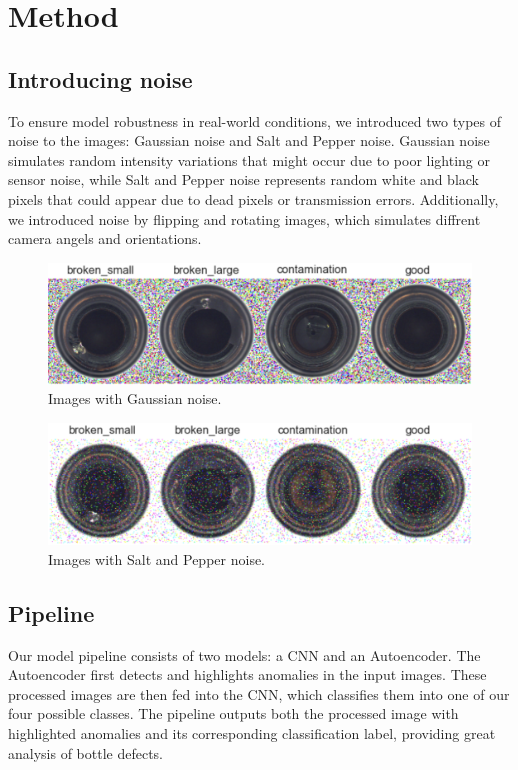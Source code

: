 \section{Method}

\subsection{Introducing noise}
To ensure model robustness in real-world conditions, we introduced two types of noise to the images: Gaussian noise and Salt and Pepper noise. 
Gaussian noise simulates random intensity variations that might occur due to poor lighting or sensor noise, while Salt and Pepper noise represents random white and black pixels that could appear due to dead pixels or transmission errors.
Additionally, we introduced noise by flipping and rotating images, which simulates diffrent camera angels and orientations.

\begin{figure}[H]
    \centering
    \includegraphics[scale=0.55]{src/images/dataset_w_gnoise.png}
    \caption{Images with Gaussian noise.}
    \label{fig:Gnoise}
\end{figure}
\begin{figure}[H]
    \centering
    \includegraphics[scale=0.55]{src/images/dataset_w_snp.png}
    \caption{Images with Salt and Pepper noise.}
    \label{fig:snpnoise}
\end{figure}

\subsection{Pipeline}

Our model pipeline consists of two models: a CNN and an Autoencoder. 
The Autoencoder first detects and highlights anomalies in the input images. These processed images are then fed into the CNN, which classifies them into one of our four possible classes.
The pipeline outputs both the processed image with highlighted anomalies and its corresponding classification label, providing great analysis of bottle defects.

